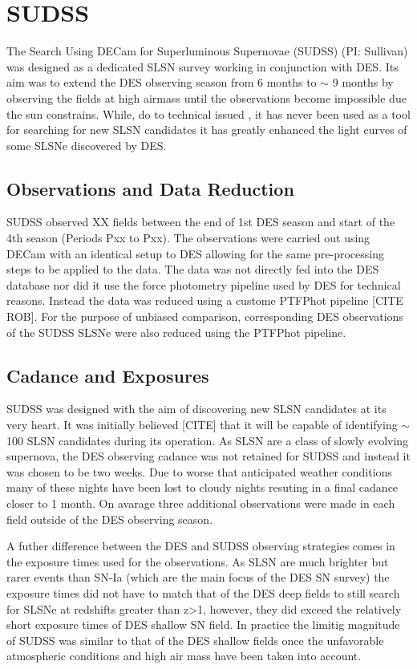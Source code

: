 \section{SUDSS}
The Search Using DECam for Superluminous Supernovae (SUDSS) (PI: Sullivan) was designed as a dedicated SLSN survey working in conjunction with DES. Its aim was to extend the DES observing season from 6 months to $\sim$ 9 months by observing the fields at high airmass until the observations become impossible due the sun constrains. While, do to technical issued , it has never been used as a tool for searching for new SLSN candidates it has greatly enhanced the light curves of some SLSNe discovered by DES. 

\subsection{Observations and Data Reduction}
SUDSS observed XX fields between the end of 1st DES season and start of the 4th season (Periods Pxx to Pxx). The observations were carried out using DECam with an identical setup to DES allowing for the same pre-processing steps to be applied to the data. The data was not directly fed into the DES database nor did it use the force photometry pipeline used by DES for technical reasons. Instead the data was reduced using a custome PTFPhot pipeline [CITE ROB]. For the purpose of unbiased comparison, corresponding DES observations of the SUDSS SLSNe were also reduced using the PTFPhot pipeline.

\subsection{Cadance and Exposures}
\label{sec:SUDSSCadance}
SUDSS was designed with the aim of discovering new SLSN candidates at its very heart. It was initially believed [CITE] that it will be capable of identifying $\sim$ 100 SLSN candidates during its operation. As SLSN are a class of slowly evolving supernova, the DES observing cadance was not retained for SUDSS and instead it was chosen to be two weeks. Due to worse that anticipated weather conditions many of these nights have been lost to cloudy nights resuting in a final cadance closer to 1 month. On avarage three additional observations were made in each field outside of the DES observing season.

A futher difference between the DES and SUDSS observing strategies comes in the exposure times used for the observations. As SLSN are much brighter but rarer events than SN-Ia (which are the main focus of the DES SN survey) the exposure times did not have to match that of the DES deep fields to still search for SLSNe at redshifts greater than z>1, however, they did exceed the relatively short exposure times of DES shallow SN field. In practice the limitig magnitude of SUDSS was similar to that of the DES shallow fields once the unfavorable atmospheric conditions and high air mass have been taken into account.

